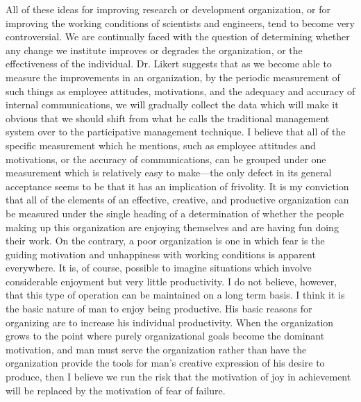 \documentclass[twocolumn]{memoir}
\begin{document}
All of these ideas for improving research or development organization, or for improving the working conditions of scientists and engineers, tend to become very controversial. We are continually faced with the question of determining whether any change we institute improves or degrades the organization, or the effectiveness of the individual. Dr. Likert suggests that as we become able to measure the improvements in an organization, by the periodic measurement of such things as employee attitudes, motivations, and the adequacy and accuracy of internal communications, we will gradually collect the data which will make it obvious that we should shift from what he calls the traditional management system over to the participative management technique. I believe that all of the specific measurement which he mentions, such as employee attitudes and motivations, or the accuracy of communications, can be grouped under one measurement which is relatively easy to make---the only defect in its general acceptance seems to be that it has an implication of frivolity. It is my conviction that all of the elements of an effective, creative, and productive organization can be measured under the single heading of a determination of whether the people making up this organization are enjoying themselves and are having fun doing their work. On the contrary, a poor organization is one in which fear is the guiding motivation and unhappiness with working conditions is apparent everywhere. It is, of course, possible to imagine situations which involve considerable enjoyment but very little productivity. I do not believe, however, that this type of operation can be maintained on a long term basis. I think it is the basic nature of man to enjoy being productive. His basic reasons for organizing are to increase his individual productivity. When the organization grows to the point where purely organizational goals become the dominant motivation, and man must serve the organization rather than have the organization provide the tools for man's creative expression of his desire to produce, then I believe we run the risk that the motivation of joy in achievement will be replaced by the motivation of fear of failure.
\end{document}
